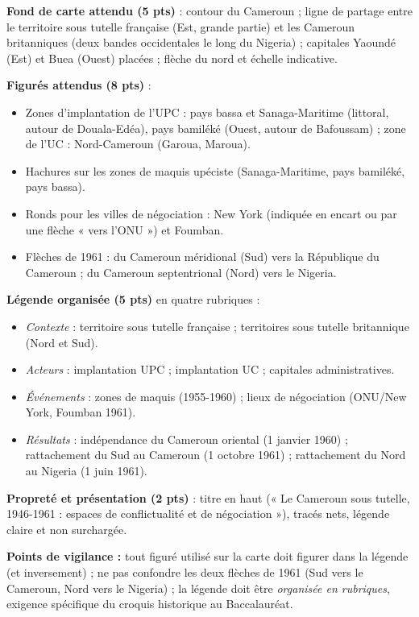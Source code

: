 \documentclass[11pt]{article}
\begin{document}
\begin{corrige}
\textbf{Fond de carte attendu (5 pts)} : contour du Cameroun ; ligne de partage entre le territoire sous tutelle française (Est, grande partie) et les Cameroun britanniques (deux bandes occidentales le long du Nigeria) ; capitales Yaoundé (Est) et Buea (Ouest) placées ; flèche du nord et échelle indicative.

\textbf{Figurés attendus (8 pts)} :
\begin{itemize}
\item Zones d'implantation de l'UPC : pays bassa et Sanaga-Maritime (littoral, autour de Douala-Edéa), pays bamiléké (Ouest, autour de Bafoussam) ; zone de l'UC : Nord-Cameroun (Garoua, Maroua).
\item Hachures sur les zones de maquis upéciste (Sanaga-Maritime, pays bamiléké, pays bassa).
\item Ronds pour les villes de négociation : New York (indiquée en encart ou par une flèche « vers l'ONU ») et Foumban.
\item Flèches de 1961 : du Cameroun méridional (Sud) vers la République du Cameroun ; du Cameroun septentrional (Nord) vers le Nigeria.
\end{itemize}

\textbf{Légende organisée (5 pts)} en quatre rubriques :
\begin{itemize}
\item \emph{Contexte} : territoire sous tutelle française ; territoires sous tutelle britannique (Nord et Sud).
\item \emph{Acteurs} : implantation UPC ; implantation UC ; capitales administratives.
\item \emph{Événements} : zones de maquis (1955-1960) ; lieux de négociation (ONU/New York, Foumban 1961).
\item \emph{Résultats} : indépendance du Cameroun oriental (1\ier{} janvier 1960) ; rattachement du Sud au Cameroun (1\ier{} octobre 1961) ; rattachement du Nord au Nigeria (1\ier{} juin 1961).
\end{itemize}

\textbf{Propreté et présentation (2 pts)} : titre en haut (« Le Cameroun sous tutelle, 1946-1961 : espaces de conflictualité et de négociation »), tracés nets, légende claire et non surchargée.

\textbf{Points de vigilance :} tout figuré utilisé sur la carte doit figurer dans la légende (et inversement) ; ne pas confondre les deux flèches de 1961 (Sud vers le Cameroun, Nord vers le Nigeria) ; la légende doit être \emph{organisée en rubriques}, exigence spécifique du croquis historique au Baccalauréat.
\end{corrige}
\end{document}
